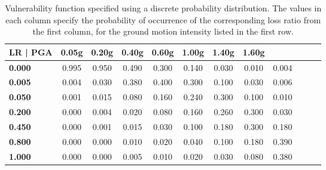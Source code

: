 \begin{table}[htbp]

\centering
\begin{tabular}{ l c c c c c c c c c c c}

\hline
\rowcolor{anti-flashwhite}
\bf{LR | PGA} & \bf{0.05g} & \bf{0.20g} & \bf{0.40g} & \bf{0.60g} & \bf{1.00g} & \bf{1.40g} & \bf{1.60g} & \bf{2.00g \\
\hline
\bf{0.000} & 0.995 & 0.950 & 0.490 & 0.300 & 0.140 & 0.030 & 0.010 & 0.004 \\
\bf{0.005} & 0.004 & 0.030 & 0.380 & 0.400 & 0.300 & 0.100 & 0.030 & 0.006 \\
\bf{0.050} & 0.001 & 0.015 & 0.080 & 0.160 & 0.240 & 0.300 & 0.100 & 0.010 \\
\bf{0.200} & 0.000 & 0.004 & 0.020 & 0.080 & 0.160 & 0.260 & 0.300 & 0.030 \\
\bf{0.450} & 0.000 & 0.001 & 0.015 & 0.030 & 0.100 & 0.180 & 0.300 & 0.180 \\
\bf{0.800} & 0.000 & 0.000 & 0.010 & 0.020 & 0.040 & 0.100 & 0.180 & 0.390 \\
\bf{1.000} & 0.000 & 0.000 & 0.005 & 0.010 & 0.020 & 0.030 & 0.080 & 0.380 \\
\hline
\end{tabular}

\caption{Vulnerability function specified using a discrete probability distribution. The values in each column specify the probability of occurrence of the corresponding loss ratio from the first column, for the ground motion intensity listed in the first row.}
\label{tab:vf-pm-tax1}
\end{table}

